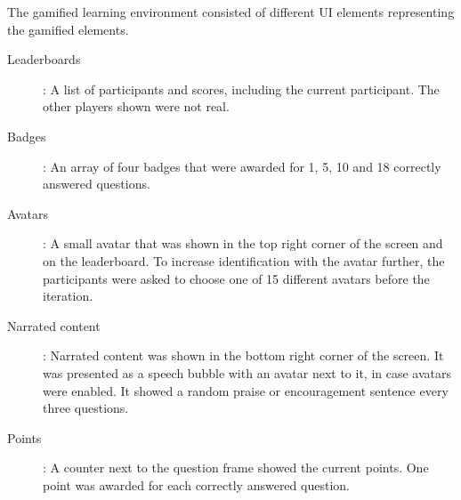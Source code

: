 The gamified learning environment consisted of different UI elements representing the gamified elements.
\begin{description}
  \item[Leaderboards]: A list of participants and scores, including the current participant. The other players shown were not real.
  \item[Badges]: An array of four badges that were awarded for 1, 5, 10 and 18 correctly answered questions.
  \item[Avatars]: A small avatar that was shown in the top right corner of the screen and on the leaderboard. To increase identification with the avatar further, the participants were asked to choose one of 15 different avatars before the iteration.
  \item[Narrated content]: Narrated content was shown in the bottom right corner of the screen. It was presented as a speech bubble with an avatar next to it, in case avatars were enabled. It showed a random praise or encouragement sentence every three questions.
  \item[Points]: A counter next to the question frame showed the current points. One point was awarded for each correctly answered question.
\end{description}
